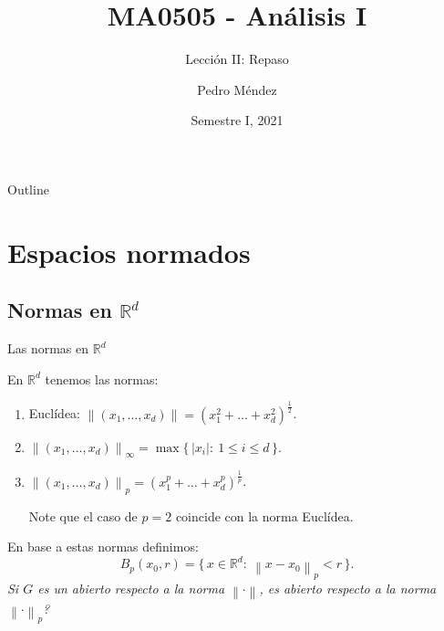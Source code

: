 \documentclass[utf8]{beamer}
\title[MA0505]{MA0505 - An\'alisis I}
\subtitle{Lecci\'on II: Repaso}
\author{Pedro M\'endez\inst{1}}
\institute[Universidad de Costa Rica] %
{
  \inst{1}%
  Departmento de Matem\'atica Pura y Ciencias Actuariales\\
  Universidad de Costa Rica
  }
\date[I-2021] {Semestre I, 2021}
\theoremstyle{plain}
\theoremstyle{definition}
\theoremstyle{remark}
\numberwithin{equation}{section}
\newcommand{\bR}{\mathbb{R}}    %
\newcommand{\nm}[1]{\left\|#1\right\|} %
\newcommand{\set}[1]{\{\,#1\,\}}    %
\renewcommand{\leq}{\leqslant}          %
\begin{document}
\begin{frame}
  \titlepage
\end{frame}

\begin{frame}{Outline}
  \tableofcontents
\end{frame}





\section{Espacios normados}

\subsection{Normas en $\bR^d$}

\begin{frame}{Las normas en $\bR^d$}%

  En $\bR^d$ tenemos las normas:
  \begin{enumerate}
    \item Eucl\'idea: $\nm{(x_1,\dots,x_d)}=(x_1^2+\dots+x_d^2)^{\frac12}$.
    \item $\nm{(x_1,\dots,x_d)}_\infty=\max\set{|x_i|:\ 1\leq i\leq d}$.
    \item $\nm{(x_1,\dots,x_d)}_p=(x_1^p+\dots+x_d^p)^{\frac1p}$.\par 
     Note que el caso de $p=2$ coincide con la norma Eucl\'idea.
  \end{enumerate}

  En base a estas normas definimos:
  $$B_p(x_0,r)=\set{x\in\bR^d:\ \nm{x-x_0}_p<r}.$$
  \emph{Si $G$ es un abierto respecto a la norma $\nm{\cdot}$, es abierto respecto a la norma $\nm{\cdot}_p$?}
\end{frame}
\end{document}
